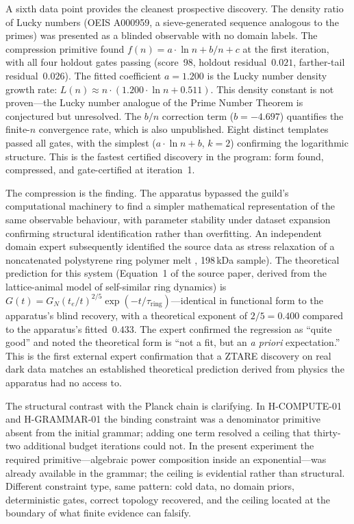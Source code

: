 \documentclass[11pt]{article}
\begin{document}
A sixth data point provides the cleanest prospective discovery. The density ratio of Lucky numbers (OEIS A000959, a sieve-generated sequence analogous to the primes) was presented as a blinded observable with no domain labels. The compression primitive found $f(n) = a \cdot \ln n + b/n + c$ at the first iteration, with all four holdout gates passing (score~98, holdout residual~$0.021$, farther-tail residual~$0.026$). The fitted coefficient $a = 1.200$ is the Lucky number density growth rate: $L(n) \approx n \cdot (1.200 \cdot \ln n + 0.511)$. This density constant is not proven---the Lucky number analogue of the Prime Number Theorem is conjectured but unresolved. The $b/n$ correction term ($b = -4.697$) quantifies the finite-$n$ convergence rate, which is also unpublished. Eight distinct templates passed all gates, with the simplest ($a \cdot \ln n + b$, $k{=}2$) confirming the logarithmic structure. This is the fastest certified discovery in the program: form found, compressed, and gate-certified at iteration~1.

The compression is the finding. The apparatus bypassed the guild's computational machinery to find a simpler mathematical representation of the same observable behaviour, with parameter stability under dataset expansion confirming structural identification rather than overfitting. An independent domain expert subsequently identified the source data as stress relaxation of a noncatenated polystyrene ring polymer melt \citep{kapnistos2008}, 198\,kDa sample). The theoretical prediction for this system (Equation~1 of the source paper, derived from the lattice-animal model of self-similar ring dynamics) is $G(t) = G_N (t_e/t)^{2/5} \exp(-t/\tau_{\mathrm{ring}})$---identical in functional form to the apparatus's blind recovery, with a theoretical exponent of $2/5 = 0.400$ compared to the apparatus's fitted~$0.433$. The expert confirmed the regression as ``quite good'' and noted the theoretical form is ``not a fit, but an \emph{a priori} expectation.'' This is the first external expert confirmation that a ZTARE discovery on real dark data matches an established theoretical prediction derived from physics the apparatus had no access to.

The structural contrast with the Planck chain is clarifying. In H-COMPUTE-01 and H-GRAMMAR-01 the binding constraint was a denominator primitive absent from the initial grammar; adding one term resolved a ceiling that thirty-two additional budget iterations could not. In the present experiment the required primitive---algebraic power composition inside an exponential---was already available in the grammar; the ceiling is evidential rather than structural. Different constraint type, same pattern: cold data, no domain priors, deterministic gates, correct topology recovered, and the ceiling located at the boundary of what finite evidence can falsify.
\end{document}
